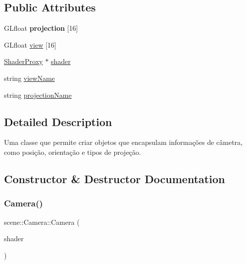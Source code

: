 \subsection*{Public Attributes}
\begin{DoxyCompactItemize}
\item 
\mbox{\label{classscene_1_1_camera_acacc3572b39cffa80213a145bf741c2b}} 
G\+Lfloat {\bfseries projection} \mbox{[}16\mbox{]}
\item 
G\+Lfloat \mbox{\hyperlink{classscene_1_1_camera_af52b73ac5111d33233f1644ac9968bfa}{view}} \mbox{[}16\mbox{]}
\item 
\mbox{\hyperlink{classshaderutils_1_1_shader_proxy}{Shader\+Proxy}} $\ast$ \mbox{\hyperlink{classscene_1_1_camera_a114ec90a596436a0598685d877f6b9d6}{shader}}
\item 
string \mbox{\hyperlink{classscene_1_1_camera_a5487802433bfc79bd974e01c2067b6f2}{view\+Name}}
\item 
string \mbox{\hyperlink{classscene_1_1_camera_ac121b93d89f62b2e7537c644f57d6464}{projection\+Name}}
\end{DoxyCompactItemize}


\subsection{Detailed Description}
Uma classe que permite criar objetos que encapsulam informações de câmetra, como posição, orientação e tipos de projeção. 

\subsection{Constructor \& Destructor Documentation}
\mbox{\label{classscene_1_1_camera_ac316cb07964d6e5a40ad4d40f3bfaa16}} 
\subsubsection{\texorpdfstring{Camera()}{Camera()}}
{\footnotesize\ttfamily scene\+::\+Camera\+::\+Camera (\begin{DoxyParamCaption}\item[{\mbox{\hyperlink{classshaderutils_1_1_shader_proxy}{Shader\+Proxy}} $\ast$}]{shader }\end{DoxyParamCaption})\hspace{0.3cm}{\ttfamily [inline]}}

